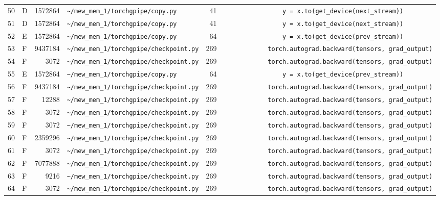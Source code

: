 \documentclass{article}
\begin{document}
\begin{longtable}{r l r p{6.5cm} r p{7.0cm}}
50 & D & 1572864 & \lstinline|~/mew_mem_1/torchgpipe/copy.py| & 41 & \lstinline|                y = x.to(get_device(next_stream))| \\
51 & D & 1572864 & \lstinline|~/mew_mem_1/torchgpipe/copy.py| & 41 & \lstinline|                y = x.to(get_device(next_stream))| \\
52 & E & 1572864 & \lstinline|~/mew_mem_1/torchgpipe/copy.py| & 64 & \lstinline|                y = x.to(get_device(prev_stream))| \\
53 & F & 9437184 & \lstinline|~/mew_mem_1/torchgpipe/checkpoint.py| & 269 & \lstinline|            torch.autograd.backward(tensors, grad_output)| \\
54 & F & 3072 & \lstinline|~/mew_mem_1/torchgpipe/checkpoint.py| & 269 & \lstinline|            torch.autograd.backward(tensors, grad_output)| \\
55 & E & 1572864 & \lstinline|~/mew_mem_1/torchgpipe/copy.py| & 64 & \lstinline|                y = x.to(get_device(prev_stream))| \\
56 & F & 9437184 & \lstinline|~/mew_mem_1/torchgpipe/checkpoint.py| & 269 & \lstinline|            torch.autograd.backward(tensors, grad_output)| \\
57 & F & 12288 & \lstinline|~/mew_mem_1/torchgpipe/checkpoint.py| & 269 & \lstinline|            torch.autograd.backward(tensors, grad_output)| \\
58 & F & 3072 & \lstinline|~/mew_mem_1/torchgpipe/checkpoint.py| & 269 & \lstinline|            torch.autograd.backward(tensors, grad_output)| \\
59 & F & 3072 & \lstinline|~/mew_mem_1/torchgpipe/checkpoint.py| & 269 & \lstinline|            torch.autograd.backward(tensors, grad_output)| \\
60 & F & 2359296 & \lstinline|~/mew_mem_1/torchgpipe/checkpoint.py| & 269 & \lstinline|            torch.autograd.backward(tensors, grad_output)| \\
61 & F & 3072 & \lstinline|~/mew_mem_1/torchgpipe/checkpoint.py| & 269 & \lstinline|            torch.autograd.backward(tensors, grad_output)| \\
62 & F & 7077888 & \lstinline|~/mew_mem_1/torchgpipe/checkpoint.py| & 269 & \lstinline|            torch.autograd.backward(tensors, grad_output)| \\
63 & F & 9216 & \lstinline|~/mew_mem_1/torchgpipe/checkpoint.py| & 269 & \lstinline|            torch.autograd.backward(tensors, grad_output)| \\
64 & F & 3072 & \lstinline|~/mew_mem_1/torchgpipe/checkpoint.py| & 269 & \lstinline|            torch.autograd.backward(tensors, grad_output)| \\

\end{longtable}
\end{document}
